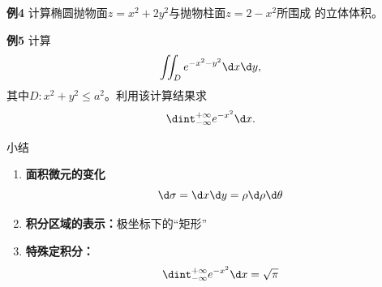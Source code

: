 \begin{frame}
	\linespread{1.2}
	\begin{exampleblock}{{\bf 例4}\hfill}
		计算椭圆抛物面$z=x^2+2y^2$与抛物柱面$z=2-x^2$所围成
		的立体体积。
	\end{exampleblock}
	\pause 
	\begin{center}
	\end{center}
\end{frame}

\begin{frame}
	\linespread{1.2}
	\begin{alertblock}{{\bf 例5}\hfill}
		计算
		$$\iint_De^{-x^2-y^2}\d x\d y,$$
		其中$D:x^2+y^2\leq a^2$。利用该计算结果求
		$$\dint_{-\infty}^{+\infty}e^{-x^2}\d x.$$
	\end{alertblock}
\end{frame}

\begin{frame}[<+->]{小结}
	\linespread{1.2}
	\begin{enumerate}
	  \item {\bf 面积微元的变化}
	  $$\d\sigma=\d x\d y=\rho \d\rho \d\theta$$
	  \item {\bf 积分区域的表示：}极坐标下的“矩形”
	  \item {\bf 特殊定积分：}
	  $$\dint_{-\infty}^{+\infty}e^{-x^2}\d x=\sqrt{\pi}$$
	\end{enumerate}
\end{frame}


